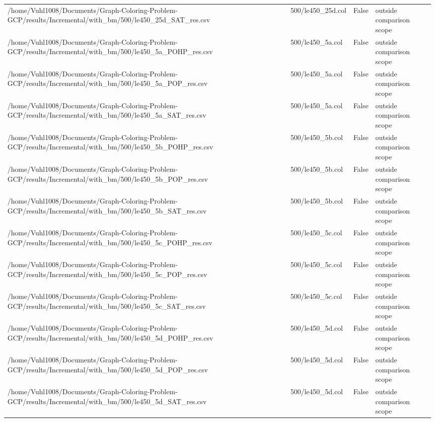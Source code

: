 \begin{table}[htbp]
\begin{tabular}{llll}
/home/Vuhl1008/Documents/Graph-Coloring-Problem-GCP/results/Incremental/with\_bm/500/le450\_25d\_SAT\_res.csv & 500/le450\_25d.col & False & outside comparison scope \\
/home/Vuhl1008/Documents/Graph-Coloring-Problem-GCP/results/Incremental/with\_bm/500/le450\_5a\_POHP\_res.csv & 500/le450\_5a.col & False & outside comparison scope \\
/home/Vuhl1008/Documents/Graph-Coloring-Problem-GCP/results/Incremental/with\_bm/500/le450\_5a\_POP\_res.csv & 500/le450\_5a.col & False & outside comparison scope \\
/home/Vuhl1008/Documents/Graph-Coloring-Problem-GCP/results/Incremental/with\_bm/500/le450\_5a\_SAT\_res.csv & 500/le450\_5a.col & False & outside comparison scope \\
/home/Vuhl1008/Documents/Graph-Coloring-Problem-GCP/results/Incremental/with\_bm/500/le450\_5b\_POHP\_res.csv & 500/le450\_5b.col & False & outside comparison scope \\
/home/Vuhl1008/Documents/Graph-Coloring-Problem-GCP/results/Incremental/with\_bm/500/le450\_5b\_POP\_res.csv & 500/le450\_5b.col & False & outside comparison scope \\
/home/Vuhl1008/Documents/Graph-Coloring-Problem-GCP/results/Incremental/with\_bm/500/le450\_5b\_SAT\_res.csv & 500/le450\_5b.col & False & outside comparison scope \\
/home/Vuhl1008/Documents/Graph-Coloring-Problem-GCP/results/Incremental/with\_bm/500/le450\_5c\_POHP\_res.csv & 500/le450\_5c.col & False & outside comparison scope \\
/home/Vuhl1008/Documents/Graph-Coloring-Problem-GCP/results/Incremental/with\_bm/500/le450\_5c\_POP\_res.csv & 500/le450\_5c.col & False & outside comparison scope \\
/home/Vuhl1008/Documents/Graph-Coloring-Problem-GCP/results/Incremental/with\_bm/500/le450\_5c\_SAT\_res.csv & 500/le450\_5c.col & False & outside comparison scope \\
/home/Vuhl1008/Documents/Graph-Coloring-Problem-GCP/results/Incremental/with\_bm/500/le450\_5d\_POHP\_res.csv & 500/le450\_5d.col & False & outside comparison scope \\
/home/Vuhl1008/Documents/Graph-Coloring-Problem-GCP/results/Incremental/with\_bm/500/le450\_5d\_POP\_res.csv & 500/le450\_5d.col & False & outside comparison scope \\
/home/Vuhl1008/Documents/Graph-Coloring-Problem-GCP/results/Incremental/with\_bm/500/le450\_5d\_SAT\_res.csv & 500/le450\_5d.col & False & outside comparison scope \\

\end{tabular}
\end{table}
